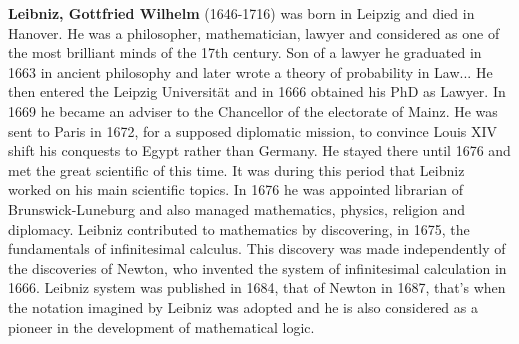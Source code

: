 \textbf{Leibniz, Gottfried Wilhelm} (1646-1716) was born in Leipzig and died in Hanover. He was a philosopher, mathematician, lawyer and considered as one of the most brilliant minds of the 17th century. Son of a lawyer he graduated in 1663 in ancient philosophy and later wrote a theory of probability in Law... He then entered the Leipzig Universität and in 1666 obtained his PhD as Lawyer. In 1669 he became an adviser to the Chancellor of the electorate of Mainz. He was sent to Paris in 1672, for a supposed diplomatic mission, to convince Louis XIV shift his conquests to Egypt rather than Germany. He stayed there until 1676 and met the great scientific of this time. It was during this period that Leibniz worked on his main scientific topics. In 1676 he was appointed librarian of Brunswick-Luneburg and also managed mathematics, physics, religion and diplomacy. Leibniz contributed to mathematics by discovering, in 1675, the fundamentals of infinitesimal calculus. This discovery was made independently of the discoveries of Newton, who invented the system of infinitesimal calculation in 1666. Leibniz system was published in 1684, that of Newton in 1687, that's when the notation imagined by Leibniz was adopted and he is also considered as a pioneer in the development of mathematical logic.

